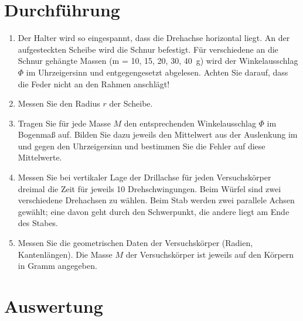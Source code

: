 \section{Durchführung} 

\begin{enumerate}
 \item Der Halter wird so eingespannt, dass die Drehachse horizontal liegt. An der aufgesteckten Scheibe wird die Schnur befestigt. Für verschiedene an die Schnur gehängte Massen (m = 10, 15, 20, 30, 40~g) wird der Winkelausschlag $\Phi$ im Uhrzeigersinn und entgegengesetzt abgelesen. Achten Sie darauf, dass die Feder nicht an den Rahmen anschlägt!
 \item Messen Sie den Radius $r$ der Scheibe.
 \item Tragen Sie für jede Masse $M$ den entsprechenden Winkelausschlag $\Phi$ im Bogenma{\ss} auf. Bilden Sie dazu jeweils den Mittelwert aus der Auslenkung im und gegen den Uhrzeigersinn und bestimmen Sie die Fehler auf diese Mittelwerte.
 \item Messen Sie bei vertikaler Lage der Drillachse für jeden Versuchskörper dreimal die Zeit für jeweils 10 Drehschwingungen. Beim Würfel sind zwei verschiedene Drehachsen zu wählen. Beim Stab werden zwei parallele Achsen gewählt; eine davon geht durch den Schwerpunkt, die andere liegt am Ende des Stabes.
 \item Messen Sie die geometrischen Daten der Versuchskörper (Radien, Kantenlängen). Die Masse $M$ der Versuchskörper ist jeweils auf den Körpern in Gramm angegeben.
\end{enumerate}

\section{Auswertung} 

